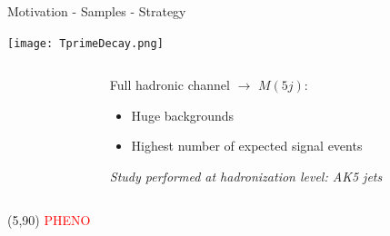 \begin{frame}{Motivation - Samples - Strategy}
\vspace{-1.0cm}

\begin{center}
  \texttt{[image: TprimeDecay.png]}
\end{center}

\vspace{-.5cm}
\begin{columns}
\begin{column}{.60\textwidth}
\end{column}
\begin{column}{.40\textwidth}
\begin{block}{}\tiny
Full hadronic channel $\to$ $M(5j)$:
  \begin{itemize}\tiny
  \item Huge backgrounds
  \item Highest number of expected signal events
  \end{itemize}
\textit{Study performed at hadronization level: AK5 jets}
\end{block}
\end{column}
\end{columns}

\begin{textblock}{50}(5,90)
\textcolor{red}{PHENO}
\end{textblock}

\end{frame}

